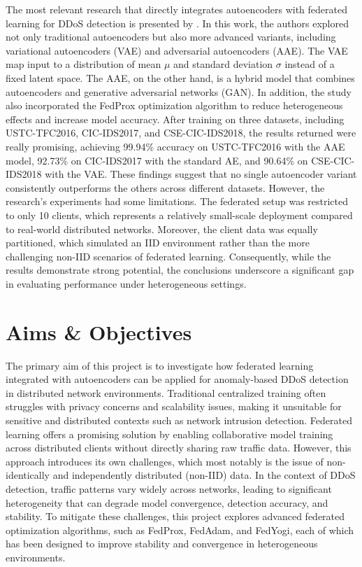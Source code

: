 The most relevant research that directly integrates autoencoders with federated learning for DDoS detection is presented by \cite{IDRISSI2023121000}. In this work, the authors explored not only traditional autoencoders but also more advanced variants, including variational autoencoders (VAE) and adversarial autoencoders (AAE). The VAE map input to a distribution of mean $\mu$ and standard deviation $\sigma$ instead of a fixed latent space. The AAE, on the other hand, is a hybrid model that combines autoencoders and generative adversarial networks (GAN). In addition, the study also incorporated the FedProx optimization algorithm to reduce heterogeneous effects and increase model accuracy. After training on three datasets, including USTC-TFC2016, CIC-IDS2017, and CSE-CIC-IDS2018, the results returned were really promising, achieving 99.94\% accuracy on USTC-TFC2016 with the AAE model, 92.73\% on CIC-IDS2017 with the standard AE, and 90.64\% on CSE-CIC-IDS2018 with the VAE. These findings suggest that no single autoencoder variant consistently outperforms the others across different datasets. However, the research's experiments had some limitations. The federated setup was restricted to only 10 clients, which represents a relatively small-scale deployment compared to real-world distributed networks. Moreover, the client data was equally partitioned, which simulated an IID environment rather than the more challenging non-IID scenarios of federated learning. Consequently, while the results demonstrate strong potential, the conclusions underscore a significant gap in evaluating performance under heterogeneous settings.

\section{Aims \& Objectives}

The primary aim of this project is to investigate how federated learning integrated with autoencoders can be applied for anomaly-based DDoS detection in distributed network environments. Traditional centralized training often struggles with privacy concerns and scalability issues, making it unsuitable for sensitive and distributed contexts such as network intrusion detection. Federated learning offers a promising solution by enabling collaborative model training across distributed clients without directly sharing raw traffic data. However, this approach introduces its own challenges, which most notably is the issue of non-identically and independently distributed (non-IID) data. In the context of DDoS detection, traffic patterns vary widely across networks, leading to significant heterogeneity that can degrade model convergence, detection accuracy, and stability. To mitigate these challenges, this project explores advanced federated optimization algorithms, such as FedProx, FedAdam, and FedYogi, each of which has been designed to improve stability and convergence in heterogeneous environments.

